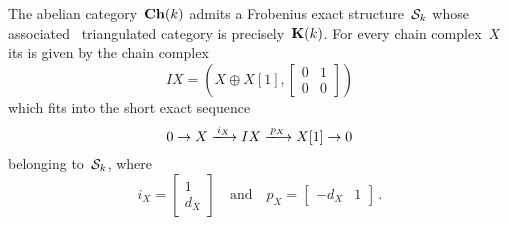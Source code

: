 \documentclass[a4paper,10pt]{scrartcl}
\begin{document}
The abelian category~$\mathbf{Ch}(k)$ admits a Frobenius exact structure~$\mathcal{S}_k$ whose associated~{} triangulated category is precisely~$\mathbf{K}(k)$.
For every chain complex~$X$ its  is given by the chain complex
\[
  IX
  =
  \left(
    X \oplus X[1],
    \begin{bmatrix}
      0 & 1 \\
      0 & 0
    \end{bmatrix}
  \right)
\]
which fits into the short exact sequence
\begin{equation}
  \label{ses of chain complexes}
  0
  \to
  X
  \xlongto{ i_X }
  IX
  \xlongto{ p_X }
  X[1]
  \to
  0
\end{equation}
belonging to~$\mathcal{S}_k$, where
\[
  i_X
  =
  \begin{bmatrix}
    1 \\
    d_X
  \end{bmatrix}
  \quad\text{and}\quad
  p_X
  =
  \begin{bmatrix}
    -d_X & 1
  \end{bmatrix} \,.
\]
\end{document}
